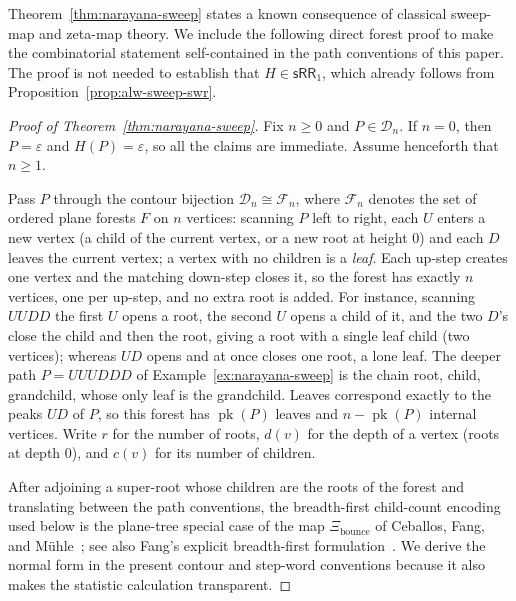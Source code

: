 \documentclass[11pt]{article}
\theoremstyle{definition}
\newcommand{\D}{\mathcal D}
\newcommand{\SWR}{\mathsf{sRR}_1}
\newcommand{\pk}{\operatorname{pk}}
\begin{document}
Theorem~\ref{thm:narayana-sweep} states a known consequence of classical
sweep-map and zeta-map theory.  We include the following direct forest proof to
make the combinatorial statement self-contained in the path conventions of
this paper.  The proof is not needed to establish that $H\in\SWR$, which
already follows from Proposition~\ref{prop:alw-sweep-swr}.

\begin{proof}[Proof of Theorem~\ref{thm:narayana-sweep}]
Fix $n\ge 0$ and $P\in\D_n$.  If $n=0$, then $P=\varepsilon$ and
$H(P)=\varepsilon$, so all the claims are immediate.  Assume henceforth that
$n\ge 1$.

Pass $P$ through the contour bijection $\D_n\cong\mathcal F_n$, where
$\mathcal F_n$ denotes the set of ordered plane forests $F$ on $n$ vertices:
scanning $P$ left to right, each $U$ enters a new
vertex (a child of the current vertex, or a new root at height $0$) and each $D$
leaves the current vertex; a vertex with no children is a \emph{leaf}.  Each
up-step creates one vertex and the matching down-step closes it, so the forest
has exactly $n$ vertices, one per up-step, and no extra root is added.  For
instance, scanning $UUDD$ the first $U$ opens a root, the second $U$ opens a
child of it, and the two $D$'s close the child and then the root, giving a root
with a single leaf child (two vertices); whereas $UD$ opens and at once closes
one root, a lone leaf.  The deeper path $P=UUUDDD$ of
Example~\ref{ex:narayana-sweep} is the chain root, child, grandchild, whose only
leaf is the grandchild.  Leaves correspond exactly to the peaks $UD$ of $P$, so
this forest has $\pk(P)$ leaves and $n-\pk(P)$ internal vertices.  Write $r$ for
the number of roots, $d(v)$ for the depth of a vertex (roots at depth $0$), and
$c(v)$ for its number of children.

After adjoining a super-root whose children are the roots of the forest and
translating between the path conventions, the breadth-first child-count
encoding used below is the plane-tree special case of the map
$\Xi_{\mathrm{bounce}}$ of Ceballos, Fang, and
M\"uhle~\cite{CeballosFangMuhle2020}; see also Fang's explicit breadth-first
formulation~\cite{Fang2024}.  We derive the normal form in the present contour
and step-word conventions because it also makes the statistic calculation
transparent.


\end{proof}
\end{document}

